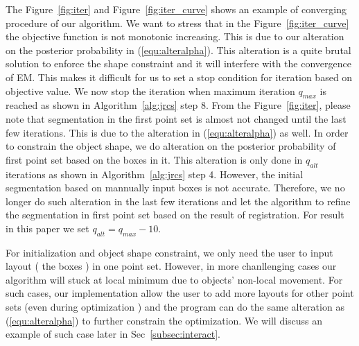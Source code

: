 The Figure~\ref{fig:iter} and Figure~\ref{fig:iter_curve}  shows an example of converging procedure of our algorithm. We want to stress that in the Figure~\ref{fig:iter_curve} the objective function is not monotonic increasing. This is due to our alteration on the posterior probability in (\ref{equ:alteralpha}). This alteration is a quite brutal solution to enforce the shape constraint and it will interfere with the convergence of EM. This makes it difficult for us to set a stop condition for iteration based on objective value. We now stop the iteration when maximum iteration $q_{max}$ is reached as shown in Algorithm~\ref{alg:jrcs} step 8. From the Figure~\ref{fig:iter}, please note that segmentation in the first point set is almost not changed until the last few iterations. This is due to the alteration in (\ref{equ:alteralpha}) as well. In order to constrain the object shape, we do alteration on the posterior probability of first point set based on the boxes in it. This alteration is only done in $q_{alt}$ iterations as shown in Algorithm~\ref{alg:jrcs} step 4. However, the initial segmentation based on mannually input boxes is not accurate. Therefore, we no longer do such alteration in the last few iterations and let the algorithm to refine the segmentation in first point set based on the result of registration. For result in this paper we set $q_{alt}=q_{max}-10$.

For initialization and object shape constraint, we only need the user to input layout ( the boxes ) in one point set. However, in more chanllenging cases our algorithm will stuck at local minimum due to objects' non-local movement. For such cases, our implementation allow the user to add more layouts for other point sets (even during optimization ) and the program can do the same alteration as (\ref{equ:alteralpha}) to further constrain the optimization. We will discuss an example of such case later in Sec~\ref{subsec:interact}.